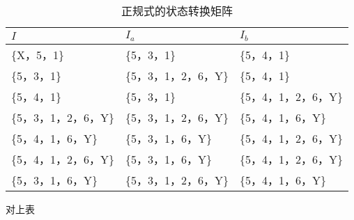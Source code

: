 \begin{table}[H]
    \centering
    \caption{正规式的状态转换矩阵}
    \label{table:正规式的状态转换矩阵}
    \setlength{\tabcolsep}{5mm}
    \begin{tabular}{l|ll}
        \toprule
        \textbf{$I$} & \textbf{$I_a$} & \textbf{$I_b$} \\
        \midrule
        \{X，5，1\} & \{5，3，1\} & \{5，4，1\} \\
        \{5，3，1\} & \{5，3，1，2，6，Y\} & \{5，4，1\} \\
        \{5，4，1\} & \{5，3，1\} & \{5，4，1，2，6，Y\} \\
        \{5，3，1，2，6，Y\} & \{5，3，1，2，6，Y\} & \{5，4，1，6，Y\} \\
        \{5，4，1，6，Y\} & \{5，3，1，6，Y\} & \{5，4，1，2，6，Y\} \\
        \{5，4，1，2，6，Y\} & \{5，3，1，6，Y\} & \{5，4，1，2，6，Y\} \\
        \{5，3，1，6，Y\} & \{5，3，1，2，6，Y\} & \{5，4，1，6，Y\} \\
        \bottomrule
    \end{tabular}
\end{table}

对上表



















\newpage